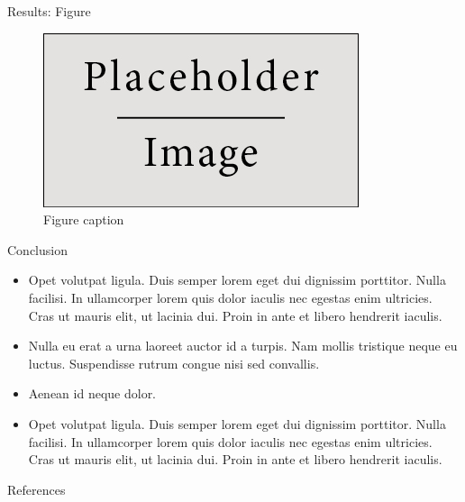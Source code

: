 \documentclass[final,hyperref={pdfpagelabels=false}]{beamer}
\begin{document}
\begin{frame}[t]
\begin{columns}[t]
\begin{column}{.465\textwidth}
\begin{block}{Results: Figure}
\begin{figure}
\includegraphics[width=0.8\linewidth]{placeholder.jpg}
\caption{Figure caption}
\end{figure}

\end{block}


\begin{block}{Conclusion}

\begin{itemize}
\item Opet volutpat ligula. Duis semper lorem eget dui dignissim porttitor. Nulla facilisi. In ullamcorper lorem quis dolor iaculis nec egestas enim ultricies. Cras ut mauris elit, ut lacinia dui. Proin in ante et libero hendrerit iaculis.
\item Nulla eu erat a urna laoreet auctor id a turpis. Nam mollis tristique neque eu luctus. Suspendisse rutrum congue nisi sed convallis. 
\item Aenean id neque dolor.
\item Opet volutpat ligula. Duis semper lorem eget dui dignissim porttitor. Nulla facilisi. In ullamcorper lorem quis dolor iaculis nec egestas enim ultricies. Cras ut mauris elit, ut lacinia dui. Proin in ante et libero hendrerit iaculis.
\end{itemize}

\end{block}


\begin{block}{References}
        

\end{block}
\end{column}
\end{columns}
\end{frame}
\end{document}
